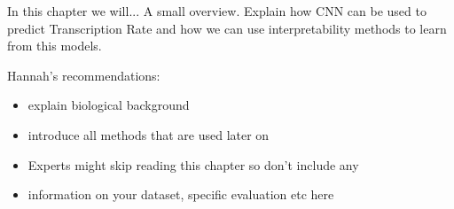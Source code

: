 In this chapter we will...
A small overview. Explain how CNN can be used to predict Transcription Rate and how we can use interpretability methods to learn from this models.


Hannah's recommendations:
\begin{itemize}
  \item explain biological background
  \item introduce all methods that are used later on
  \item Experts might skip reading this chapter so don’t include any \item information on your dataset, specific evaluation etc here
\end{itemize}
